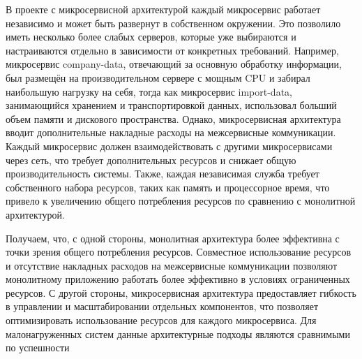     В проекте с микросервисной архитектурой каждый микросервис работает независимо и может быть развернут в собственном окружении. Это позволило иметь несколько более слабых серверов, которые уже выбираются и настраиваются отдельно в зависимости от конкретных требований. Например, микросервис company-data, отвечающий за основную обработку информации, был размещён на производительном сервере с мощным CPU и забирал наибольшую нагрузку на себя, тогда как микросервис import-data, занимающийся хранением и транспортировкой данных, использовал больший объем памяти и дискового пространства. Однако, микросервисная архитектура вводит дополнительные накладные расходы на межсервисные коммуникации. Каждый микросервис должен взаимодействовать с другими микросервисами через сеть, что требует дополнительных ресурсов и снижает общую производительность системы. Также, каждая независимая служба требует собственного набора ресурсов, таких как память и процессорное время, что привело к увеличению общего потребления ресурсов по сравнению с монолитной архитектурой.
    
    Получаем, что, с одной стороны, монолитная архитектура более эффективна с точки зрения общего потребления ресурсов. Совместное использование ресурсов и отсутствие накладных расходов на межсервисные коммуникации позволяют монолитному приложению работать более эффективно в условиях ограниченных ресурсов. С другой стороны, микросервисная архитектура предоставляет гибкость в управлении и масштабировании отдельных компонентов, что позволяет оптимизировать использование ресурсов для каждого микросервиса. Для малонагруженных систем данные архитектурные подходы являются сравнимыми по успешности
        
\clearpage